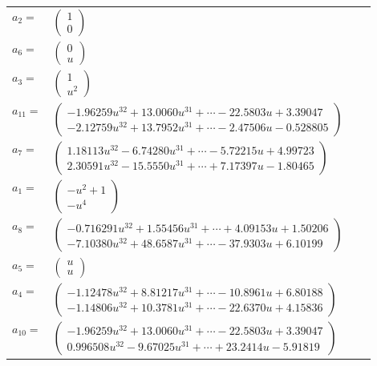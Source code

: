 \documentclass[1p]{elsarticle_modified}
\theoremstyle{definition}
\begin{document}
\begin{tabular}{m{7pt} m{180pt} m{7pt} m{180pt} }
\flushright $a_{2}=$&$\begin{pmatrix}1\\0\end{pmatrix}$ \\
\flushright $a_{6}=$&$\begin{pmatrix}0\\u\end{pmatrix}$ \\
\flushright $a_{3}=$&$\begin{pmatrix}1\\u^2\end{pmatrix}$ \\
\flushright $a_{11}=$&$\begin{pmatrix}-1.96259 u^{32}+13.0060 u^{31}+\cdots-22.5803 u+3.39047\\-2.12759 u^{32}+13.7952 u^{31}+\cdots-2.47506 u-0.528805\end{pmatrix}$ \\
\flushright $a_{7}=$&$\begin{pmatrix}1.18113 u^{32}-6.74280 u^{31}+\cdots-5.72215 u+4.99723\\2.30591 u^{32}-15.5550 u^{31}+\cdots+7.17397 u-1.80465\end{pmatrix}$ \\
\flushright $a_{1}=$&$\begin{pmatrix}- u^2+1\\- u^4\end{pmatrix}$ \\
\flushright $a_{8}=$&$\begin{pmatrix}-0.716291 u^{32}+1.55456 u^{31}+\cdots+4.09153 u+1.50206\\-7.10380 u^{32}+48.6587 u^{31}+\cdots-37.9303 u+6.10199\end{pmatrix}$ \\
\flushright $a_{5}=$&$\begin{pmatrix}u\\u\end{pmatrix}$ \\
\flushright $a_{4}=$&$\begin{pmatrix}-1.12478 u^{32}+8.81217 u^{31}+\cdots-10.8961 u+6.80188\\-1.14806 u^{32}+10.3781 u^{31}+\cdots-22.6370 u+4.15836\end{pmatrix}$ \\
\flushright $a_{10}=$&$\begin{pmatrix}-1.96259 u^{32}+13.0060 u^{31}+\cdots-22.5803 u+3.39047\\0.996508 u^{32}-9.67025 u^{31}+\cdots+23.2414 u-5.91819\end{pmatrix}$ \\

\end{tabular}
\end{document}
